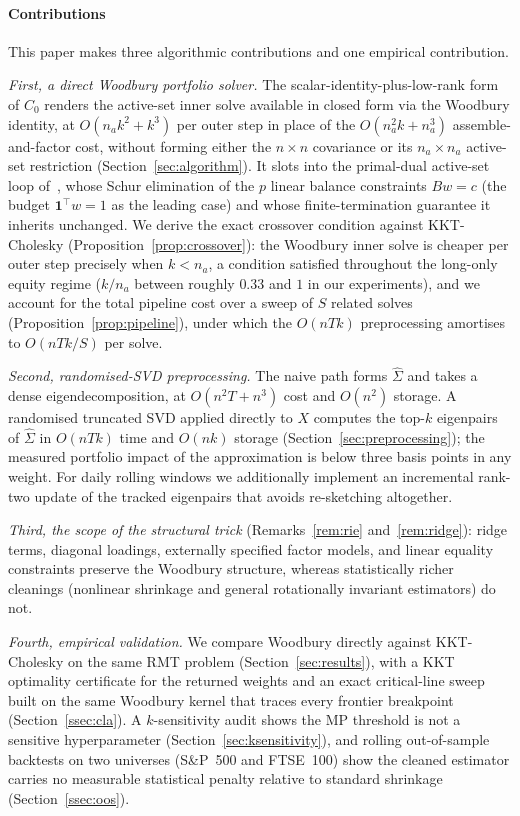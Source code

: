 \paragraph{Contributions}
This paper makes three algorithmic contributions and one empirical
contribution.

\emph{First, a direct Woodbury portfolio solver.} The scalar-identity-plus-low-rank
form of $C_0$ renders the active-set inner solve available in
closed form via the Woodbury identity, at $O(n_a k^2 + k^3)$ per outer step in
place of the $O(n_a^2 k + n_a^3)$ assemble-and-factor cost, without forming
either the $n \times n$ covariance or its $n_a \times n_a$ active-set
restriction (Section~\ref{sec:algorithm}). It slots into the primal-dual
active-set loop of~\cite{schmelzer2026nncg}, whose Schur elimination of the $p$
linear balance constraints $Bw=c$ (the budget $\mathbf{1}^\top w=1$ as the
leading case) and whose finite-termination guarantee it inherits unchanged. We
derive the exact crossover
condition against KKT-Cholesky (Proposition~\ref{prop:crossover}): the Woodbury
inner solve is cheaper per outer step precisely when $k < n_a$, a condition
satisfied throughout the long-only equity regime ($k/n_a$ between roughly $0.33$
and $1$ in our experiments), and we account for the total pipeline cost over
a sweep of $S$ related solves (Proposition~\ref{prop:pipeline}), under which the
$O(nTk)$ preprocessing amortises to $O(nTk/S)$ per solve.

\emph{Second, randomised-SVD preprocessing.} The naive path forms $\hat\Sigma$
and takes a dense eigendecomposition, at $O(n^2 T + n^3)$ cost and $O(n^2)$
storage. A randomised truncated SVD applied directly to $X$ computes the
top-$k$ eigenpairs of $\hat\Sigma$ in $O(nTk)$ time and $O(nk)$ storage
(Section~\ref{sec:preprocessing}); the measured portfolio impact of the
approximation is below three basis points in any weight. For daily rolling
windows we additionally implement an incremental rank-two update of the tracked
eigenpairs that avoids re-sketching altogether.

\emph{Third, the scope of the structural trick}
(Remarks~\ref{rem:rie} and~\ref{rem:ridge}): ridge terms, diagonal loadings,
externally specified factor models, and linear equality constraints preserve
the Woodbury structure, whereas statistically richer cleanings (nonlinear
shrinkage and general rotationally invariant estimators) do not.

\emph{Fourth, empirical validation.} We compare Woodbury directly against
KKT-Cholesky on the same RMT problem (Section~\ref{sec:results}), with a KKT
optimality certificate for the returned weights and an exact critical-line sweep
built on the same Woodbury kernel that traces every frontier breakpoint
(Section~\ref{ssec:cla}). A $k$-sensitivity
audit shows the MP threshold is not a sensitive hyperparameter
(Section~\ref{sec:ksensitivity}), and rolling out-of-sample backtests on two
universes (S\&P~500 and FTSE~100) show the cleaned estimator carries no
measurable statistical penalty relative to standard shrinkage
(Section~\ref{ssec:oos}).


